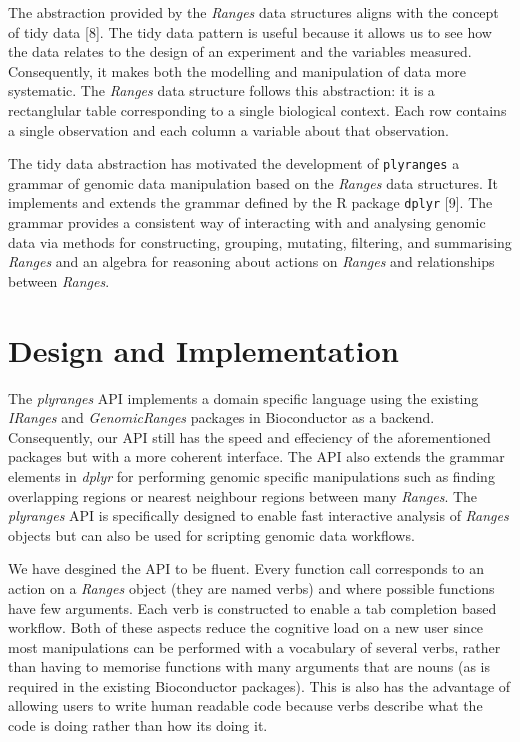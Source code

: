 \documentclass[10pt,letterpaper]{article}
\begin{document}
The abstraction provided by the \emph{Ranges} data structures aligns
with the concept of tidy data {[}8{]}. The tidy data pattern is useful
because it allows us to see how the data relates to the design of an
experiment and the variables measured. Consequently, it makes both the
modelling and manipulation of data more systematic. The \emph{Ranges}
data structure follows this abstraction: it is a rectanglular table
corresponding to a single biological context. Each row contains a single
observation and each column a variable about that observation.

The tidy data abstraction has motivated the development of
\texttt{plyranges} a grammar of genomic data manipulation based on the
\emph{Ranges} data structures. It implements and extends the grammar
defined by the R package \texttt{dplyr} {[}9{]}. The grammar provides a
consistent way of interacting with and analysing genomic data via
methods for constructing, grouping, mutating, filtering, and summarising
\emph{Ranges} and an algebra for reasoning about actions on
\emph{Ranges} and relationships between \emph{Ranges}.

\hypertarget{design-and-implementation}{%
\section{Design and Implementation}\label{design-and-implementation}}

The \emph{plyranges} API implements a domain specific language using the
existing \emph{IRanges} and \emph{GenomicRanges} packages in
Bioconductor as a backend. Consequently, our API still has the speed and
effeciency of the aforementioned packages but with a more coherent
interface. The API also extends the grammar elements in \emph{dplyr} for
performing genomic specific manipulations such as finding overlapping
regions or nearest neighbour regions between many \emph{Ranges}. The
\emph{plyranges} API is specifically designed to enable fast interactive
analysis of \emph{Ranges} objects but can also be used for scripting
genomic data workflows.

We have desgined the API to be fluent. Every function call corresponds
to an action on a \emph{Ranges} object (they are named verbs) and where
possible functions have few arguments. Each verb is constructed to
enable a tab completion based workflow. Both of these aspects reduce the
cognitive load on a new user since most manipulations can be performed
with a vocabulary of several verbs, rather than having to memorise
functions with many arguments that are nouns (as is required in the
existing Bioconductor packages). This is also has the advantage of
allowing users to write human readable code because verbs describe what
the code is doing rather than how its doing it.
\end{document}
